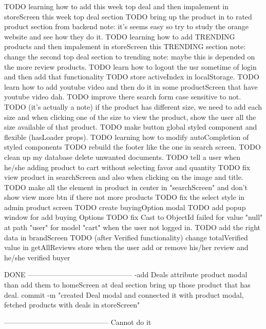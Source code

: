 TODO   learning how to add this week top deal and then impalement in storeScreen this week top deal section
TODO   bring up the product in to rated product section from backend 
      note: it's seems easy so try to study the orange website and see how they do it.
TODO   learning how to add TRENDING products and then impalement in storeScreen this TRENDING section
      note: change the second top deal section to trending 
      note: maybe this is depended on the more review products.
TODO   learn how to logout the usr sometime of login and then add that functionality
TODO   store activeIndex in localStorage.
TODO   learn how to add youtube video and then do it in some productScreen that have youtube video dah.
TODO   improve there search form case sensitive to not.
TODO   (it's actually a note) if the product has different size, we need to add each size and when
          clicking one of the size to view the product, show the user all the size available of that product.
TODO   make button global styled component and flexible (hasLoader props).
TODO   learning how to modify autoCompletion of styled components 
TODO   rebuild the footer like the one in search screen.
TODO   clean up my database delete unwanted documents.
TODO   tell a user when he/she adding product to cart without selecting favor and quantity
TODO   fix view product in searchScreen and also when clicking on the image and title.
TODO   make all the element in product in center in "searchScreen" and don't show view more btn if there not more products
TODO   fix the select style in admin product screen
TODO   create buyingOption modal 
TODO   add popup window for add buying Options
TODO   fix Cast to ObjectId failed for value "null" at path "user" for model "cart" when the user not logged in.
TODO   add the right data in brandScreen 
TODO   (after Verified functionality) change totalVerified value in getAllReviews store when the user add or remove his/her review and he/she verified buyer

DONE
--------------------------------------------
-add Deals attribute product modal than add them to homeScreen 
       at deal section bring up those product that has deal.
       commit -m "created Deal modal and connected it with product modal, fetched products with deals in 
       storeScreen"




--------------------------------------------
Cannot do it
